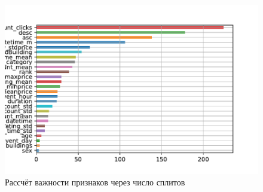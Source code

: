 \documentclass[russian, 10pt]{beamer}
\begin{document}
\begin{frame}

\begin{figure}[htp]
\centering
\includegraphics[scale=0.7]{splits.pdf}
\caption{Рассчёт важности признаков через число сплитов}
\end{figure}




\end{frame}
\end{document}
